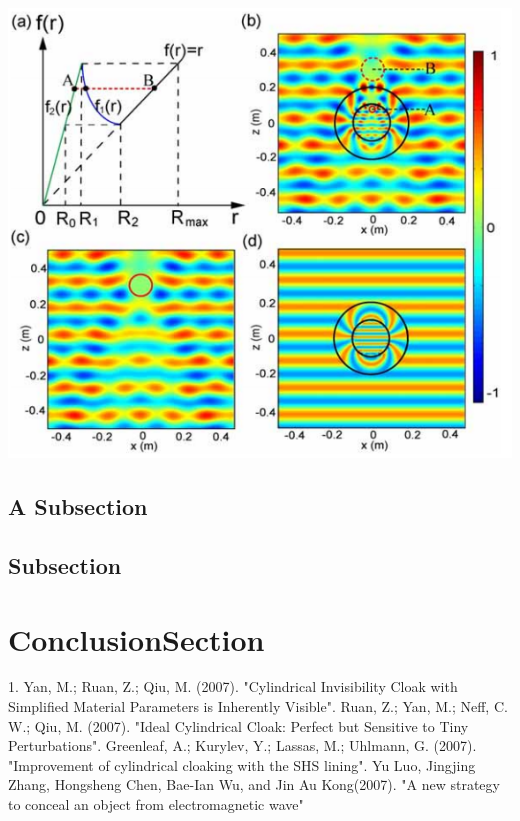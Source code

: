 \documentclass[journal]{IEEEtran}                         %
\begin{document}
\includegraphics[scale=0.55]{2}

\blindtext 
\blindtext 


\subsection{A Subsection}
\blindtext 
\blindtext 


\subsection{Subsection}

\blindtext 



\section{ConclusionSection}
\blindtext 

     

\begin{thebibliography}{99}

 1.	 Yan, M.; Ruan, Z.; Qiu, M. (2007). "Cylindrical Invisibility Cloak with Simplified Material Parameters is Inherently Visible".
 Ruan, Z.; Yan, M.; Neff, C. W.; Qiu, M. (2007). "Ideal Cylindrical Cloak: Perfect but Sensitive to Tiny Perturbations". 
Greenleaf, A.; Kurylev, Y.; Lassas, M.; Uhlmann, G. (2007). "Improvement of cylindrical cloaking with the SHS lining".
 Yu Luo, Jingjing Zhang, Hongsheng Chen, Bae-Ian Wu, and Jin Au Kong(2007). "A new strategy to conceal an object from electromagnetic wave"





\end{thebibliography}
\end{document}
